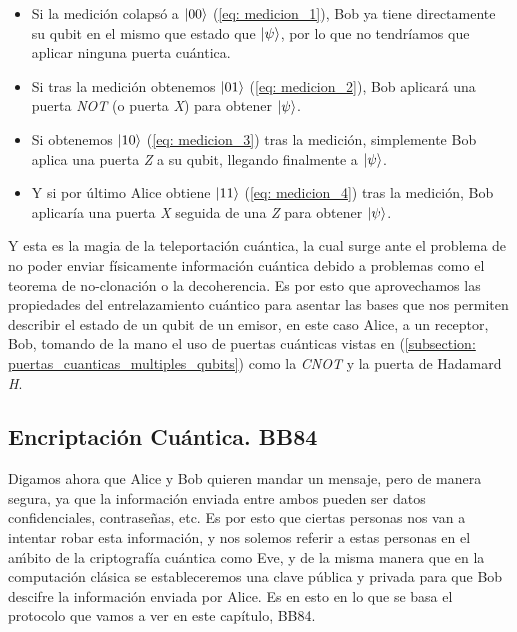 \documentclass[12pt]{article}
\numberwithin{equation}{section} %
\begin{document}
    \begin{itemize}
        \item Si la medición colapsó a \( \ket{0 0} \) (\ref{eq: medicion_1}), Bob ya tiene directamente su qubit en el mismo que estado que \( \ket{\psi} \), por lo que no tendríamos que aplicar ninguna puerta cuántica.
        \item Si tras la medición obtenemos \( \ket{0 1} \) (\ref{eq: medicion_2}), Bob aplicará una puerta \textit{NOT} (o puerta \textit{X}) para obtener \( \ket{\psi} \).
        \item Si obtenemos \( \ket{1 0} \) (\ref{eq: medicion_3}) tras la medición, simplemente Bob aplica una puerta \textit{Z} a su qubit, llegando finalmente a \( \ket{\psi} \).
        \item Y si por último Alice obtiene \( \ket{1 1} \) (\ref{eq: medicion_4}) tras la medición, Bob aplicaría una puerta \textit{X} seguida de una \textit{Z} para obtener \( \ket{\psi} \).
    \end{itemize}

    \vspace{5mm}

    Y esta es la magia de la teleportación cuántica, la cual surge ante el problema de no poder enviar físicamente información cuántica debido a problemas como el teorema de no-clonación o la decoherencia. Es por esto que aprovechamos las propiedades del entrelazamiento cuántico para asentar las bases que nos permiten describir el estado de un qubit de un emisor, en este caso Alice, a un receptor, Bob, tomando de la mano el uso de puertas cuánticas vistas en (\ref{subsection: puertas_cuanticas_multiples_qubits}) como la \textit{CNOT} y la puerta de Hadamard \textit{H}.

    \vspace{5mm}





    \subsection{Encriptación Cuántica. BB84}

    \vspace{5mm}

    Digamos ahora que Alice y Bob quieren mandar un mensaje, pero de manera segura, ya que la información enviada entre ambos pueden ser datos confidenciales, contraseñas, etc. Es por esto que ciertas personas nos van a intentar robar esta información, y nos solemos referir a estas personas en el aḿbito de la criptografía cuántica como Eve, y de la misma manera que en la computación clásica se estableceremos una clave pública y privada para que Bob descifre la información enviada por Alice. Es en esto en lo que se basa el protocolo que vamos a ver en este capítulo, BB84.
\end{document}
